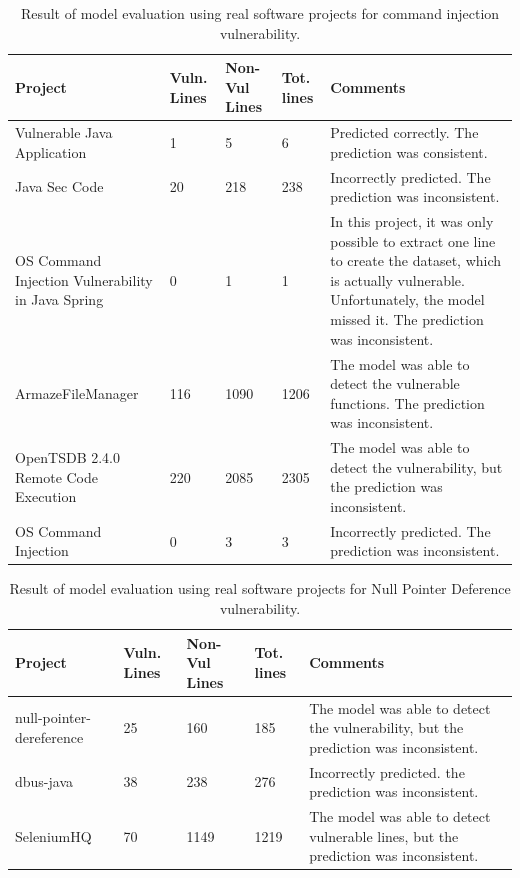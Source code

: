 \documentclass[journal,a4paper]{IEEEtran}
\begin{document}
\begin{table}[!ht]
    \centering
    \caption{Result of model evaluation  using real software projects for command injection vulnerability.}
    \begin{tabular}{|p{1.5in}|p{0.5in}|p{0.5in}|p{0.5in}|p{3in}|}
    \hline
        \textbf{Project} & \textbf{Vuln. Lines} & \textbf{Non-Vul Lines} & \textbf{Tot. lines } & \textbf{Comments} \\ \hline
        Vulnerable Java Application & 1 & 5 & 6 & Predicted correctly. The prediction was consistent. \\ \hline
        Java Sec Code & 20 & 218 & 238 & Incorrectly predicted. The prediction was inconsistent. \\ \hline
        OS Command Injection Vulnerability in Java Spring & 0 & 1 & 1 & In this project, it was only possible to extract one line to create the dataset, which is actually vulnerable. Unfortunately, the model missed it. The prediction was inconsistent. \\ \hline
        ArmazeFileManager & 116 & 1090 & 1206 & The model was able to detect the vulnerable functions. The prediction was inconsistent. \\ \hline
        OpenTSDB 2.4.0 Remote Code Execution & 220 & 2085 & 2305 & The model was able to detect the vulnerability, but the prediction was inconsistent. \\ \hline
        OS Command Injection & 0 & 3 & 3 & Incorrectly predicted. The prediction was inconsistent. \\ \hline
    \end{tabular}
	\label{tab:model_evaluation_results_CI}
\end{table}

\begin{table}[!ht]
    \centering
    \caption{Result of model evaluation  using real software projects for Null Pointer Deference vulnerability.}
    \begin{tabular}{|p{1.5in}|p{0.5in}|p{0.5in}|p{0.5in}|p{3in}|}
    \hline
        \textbf{Project} & \textbf{Vuln. Lines} & \textbf{Non-Vul Lines} & \textbf{Tot. lines } & \textbf{Comments} \\ \hline
        null-pointer-dereference & 25 & 160 & 185 & The model was able to detect the vulnerability, but the prediction was inconsistent. \\ \hline
        dbus-java & 38 & 238 & 276 & Incorrectly predicted. the prediction was inconsistent. \\ \hline
        SeleniumHQ & 70 & 1149 & 1219 & The model was able to detect vulnerable lines, but the prediction was inconsistent. \\ \hline
    \end{tabular}
	\label{tab:model_evaluation_results_NPD}
\end{table}
\end{document}
